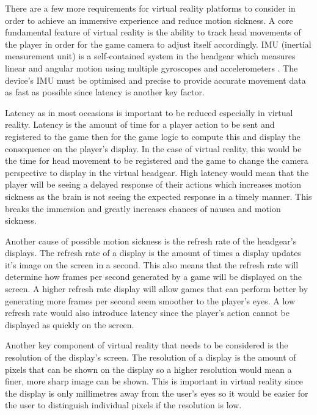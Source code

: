 There are a few more requirements for virtual reality platforms to consider in order to achieve an immersive experience and reduce motion sickness. A core fundamental feature of virtual reality is the ability to track head movements of the player in order for the game camera to adjust itself accordingly. IMU (inertial measurement unit) is a self-contained system in the headgear which measures linear and angular motion using multiple gyroscopes and accelerometers \cite{imu}. The device's IMU must be optimised and precise to provide accurate movement data as fast as possible since latency is another key factor.
\newline
\par
Latency as in most occasions is important to be reduced especially in virtual reality. Latency is the amount of time for a player action to be sent and registered to the game then for the game logic to compute this and display the consequence on the player's display. In the case of virtual reality, this would be the time for head movement to be registered and  the game to change the camera perspective to display in the virtual headgear. High latency would mean that the player will be seeing a delayed response of their actions which increases motion sickness as the brain is not seeing the expected response in a timely manner. This breaks the immersion and greatly increases chances of nausea and motion sickness.
\newline
\par
Another cause of possible motion sickness is the refresh rate of the headgear's displays. The refresh rate of a display is the amount of times a display updates it's image on the screen in a second. This also means that the refresh rate will determine how frames per second generated by a game will be displayed on the screen. A higher refresh rate display will allow games that can perform better by generating more frames per second seem smoother to the player's eyes. A low refresh rate would also introduce latency since the player's action cannot be displayed as quickly on the screen.
\newline
\par
Another key component of virtual reality that needs to be considered is the resolution of the display's screen. The resolution of a display is the amount of pixels that can be shown on the display so a higher resolution would mean a finer, more sharp image can be shown. This is important in virtual reality since the display is only millimetres away from the user's eyes so it would be easier for the user to distinguish individual pixels if the resolution is low.
